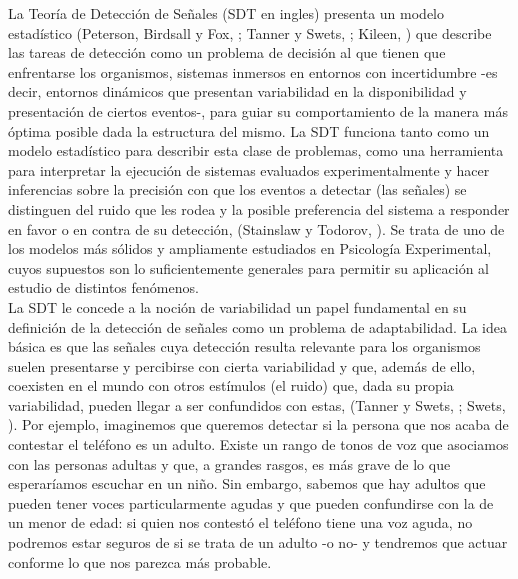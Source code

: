 La Teoría de Detección de Señales (SDT en ingles) presenta un modelo estadístico (Peterson, Birdsall y Fox, \citeyear{Peterson1954}; Tanner y Swets, \citeyear{Tanner1954}; Kileen, \citeyear{Killeen2014}) que describe las tareas de detección como un problema de decisión al que tienen que enfrentarse los organismos, sistemas inmersos en entornos con incertidumbre -es decir, entornos dinámicos que presentan variabilidad en la disponibilidad y presentación de ciertos eventos-, para guiar su comportamiento de la manera más óptima posible dada la estructura del mismo. La SDT funciona tanto como un modelo estadístico para describir esta clase de problemas, como una herramienta para interpretar la ejecución de sistemas evaluados experimentalmente y hacer inferencias sobre la precisión con que los eventos a detectar (las señales) se distinguen del ruido que les rodea y la posible preferencia del sistema a responder en favor o en contra de su detección, (Stainslaw y Todorov, \citeyear{Stainslaw1999}). Se trata de uno de los modelos más sólidos y ampliamente estudiados en Psicología Experimental, cuyos supuestos son lo suficientemente generales para permitir su aplicación al estudio de distintos fenómenos. \\

La SDT le concede a la noción de variabilidad un papel fundamental en su definición de la detección de señales como un problema de adaptabilidad. La idea básica es que las señales cuya detección resulta relevante para los organismos suelen presentarse y percibirse con cierta variabilidad y que, además de ello, coexisten en el mundo con otros estímulos (el ruido) que, dada su propia variabilidad, pueden llegar a ser confundidos con estas, (Tanner y Swets, \citeyear{Tanner1954}; Swets, \citeyear{Swets1973}). Por ejemplo, imaginemos que queremos detectar si la persona que nos acaba de contestar el teléfono es un adulto. Existe un rango de tonos de voz que asociamos con las personas adultas y que, a grandes rasgos, es más grave de lo que esperaríamos escuchar en un niño. Sin embargo, sabemos que hay adultos que pueden tener voces particularmente agudas y que pueden confundirse con la de un menor de edad: si quien nos contestó el teléfono tiene una voz aguda, no podremos estar seguros de si se trata de un adulto -o no- y tendremos que actuar conforme lo que nos parezca más probable.\\

